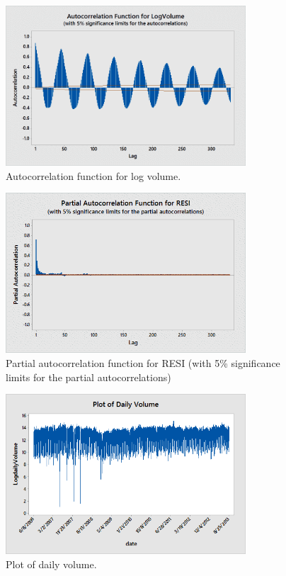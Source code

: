 \begin{figure}[!ht]
   \centering
    \includegraphics[width=0.8\textwidth]{chapters/chapter_stat_ts/figures/logvol.png}
   \caption{Autocorrelation function for log volume. \label{fig:logvolumeauto}}
\end{figure}
\begin{figure}[!ht]
   \centering
    \includegraphics[width=0.8\textwidth]{chapters/chapter_stat_ts/figures/resi.png}
   \caption{Partial autocorrelation function for RESI (with 5\% significance limits for the partial autocorrelations) \label{fig:partresi}}
\end{figure}
\begin{figure}[!ht]
   \centering
    \includegraphics[width=0.8\textwidth]{chapters/chapter_stat_ts/figures/dailyvol.png}
   \caption{Plot of daily volume. \label{fig:dailyvol}}
\end{figure}


